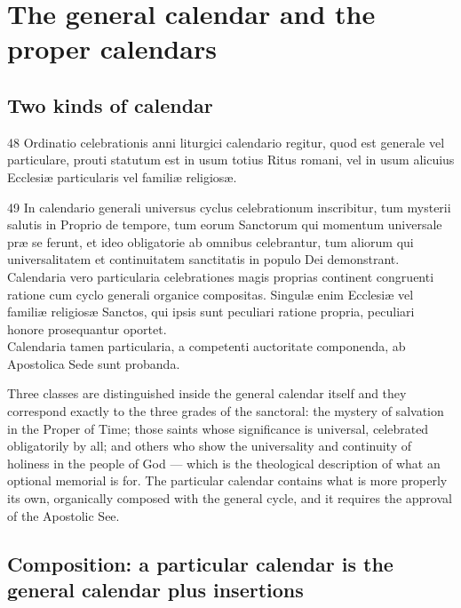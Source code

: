 \section{The general calendar and the proper calendars}
\label{sec:particular}

\subsection{Two kinds of calendar}

\begin{normtext}{ 48}
Ordinatio celebrationis anni liturgici calendario regitur, quod est generale vel particulare, prouti
statutum est in usum totius Ritus romani, vel in usum alicuius Ecclesiæ particularis vel familiæ
religiosæ.
\end{normtext}

\begin{normtext}{ 49}
In calendario generali universus cyclus celebrationum inscribitur, tum mysterii salutis in Proprio de
tempore, tum eorum Sanctorum qui momentum universale præ se ferunt, et ideo obligatorie ab omnibus
celebrantur, tum aliorum qui universalitatem et continuitatem sanctitatis in populo Dei demonstrant.\\
Calendaria vero particularia celebrationes magis proprias continent congruenti ratione cum cyclo
generali organice compositas. Singulæ enim Ecclesiæ vel familiæ religiosæ Sanctos, qui ipsis sunt
peculiari ratione propria, peculiari honore prosequantur oportet.\\
Calendaria tamen particularia, a competenti auctoritate componenda, ab Apostolica Sede sunt probanda.
\end{normtext}

Three classes are distinguished inside the general calendar itself and they correspond exactly to
the three grades of the sanctoral: the mystery of salvation in the Proper of Time; those saints
whose significance is universal, celebrated obligatorily by all; and others who show the
universality and continuity of holiness in the people of God --- which is the theological description
of what an optional memorial is for. The particular calendar contains what is more properly its own,
organically composed with the general cycle, and it requires the approval of the Apostolic See.

\subsection{Composition: a particular calendar is the general calendar plus insertions}

